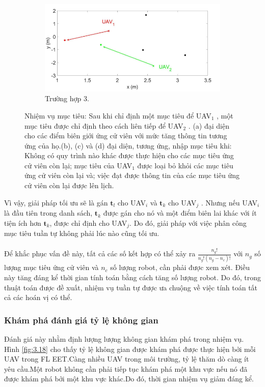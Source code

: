 \documentclass[11pt,openany]{book}
\begin{document}
\begin{figure}[H]
\begin{subfigure}[H]{0.6\linewidth}
        \label{fig:3.17c}
    \end{subfigure}
    \begin{subfigure}[H]{0.6\linewidth}
        \includegraphics[width=\linewidth]{assets/3_17_c.png}
        \caption{{Trường hợp 3.}}
        \label{fig:3.17d}
    \end{subfigure}
    \caption{Nhiệm vụ mục tiêu: Sau khi chỉ định một mục tiêu để UAV$_1$ , một mục tiêu được chỉ định theo cách liên tiếp để UAV$_2$ . (a) đại diện cho các điểm biên giới ứng cử viên với mức tăng thông tin tương ứng của họ.(b), (c) và (d) đại diện, tương ứng, nhập mục tiêu khi: Không có quy trình nào khác được thực hiện cho các mục tiêu ứng cử viên còn lại; mục tiêu của UAV$_1$ được loại bỏ khỏi các mục tiêu ứng cử viên còn lại và; việc đạt được thông tin của các mục tiêu ứng cử viên còn lại được lên lịch.}
    \label{fig:3.17}
\end{figure}
Vì vậy, giải pháp tối ưu sẽ là gán $\mathbf{t}_l$ cho UAV$_i$ và $\mathbf{t}_k$ cho UAV$_j$ . Nhưng nếu UAV$_i$ là đầu tiên trong danh sách, $\mathbf{t}_k$ được gán cho nó và một điểm biên lai khác với ít tiện ích hơn $\mathbf{t}_k$, được chỉ định cho UAV$_j$. Do đó, giải pháp với việc phân công mục tiêu tuần tự không phải lúc nào cũng tối ưu.\\\\
Để khắc phục vấn đề này, tất cả các số kết hợp có thể xảy ra $\frac{n_g!}{n_g!(n_g-n_c)!}$ với $n_g$ số lượng mục tiêu ứng cử viên và $n_c$ số lượng robot, cần phải được xem xét. Điều này tăng đáng kể thời gian tính toán bằng cách tăng số lượng robot. Do đó, trong thuật toán được đề xuất, nhiệm vụ tuần tự được ưa chuộng về việc tính toán tất cả các hoán vị có thể.
\subsubsection{Khám phá đánh giá tỷ lệ không gian}
Đánh giá này nhằm định lượng lượng không gian khám phá trong nhiệm vụ. Hình \ref{fig:3.18} cho thấy tỷ lệ không gian được khám phá được thực hiện bởi mỗi UAV trong FL EET.Càng nhiều UAV trong môi trường, tỷ lệ thăm dò càng ít yêu cầu.Một robot không cần phải tiếp tục khám phá một khu vực nếu nó đã được khám phá bởi một khu vực khác.Do đó, thời gian nhiệm vụ giảm đáng kể.
\end{document}
